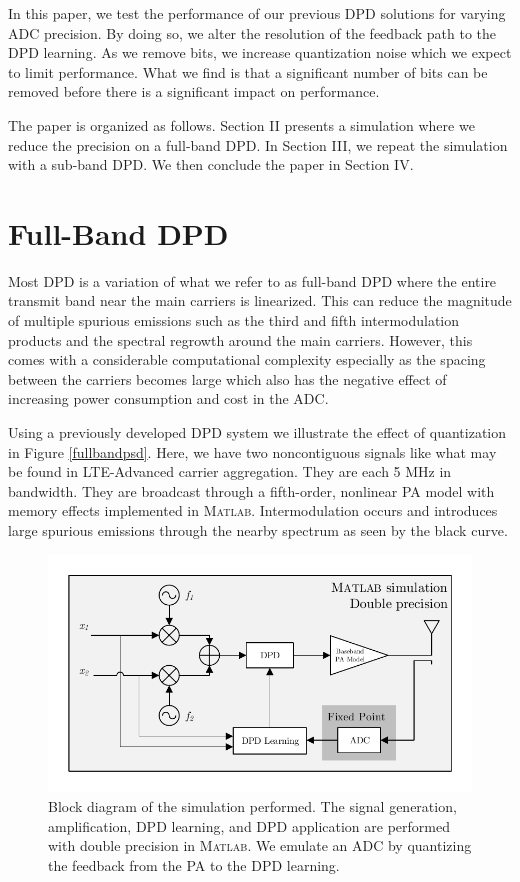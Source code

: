 \documentclass[conference]{IEEEtran}
\begin{document}
In this paper, we test the performance of our previous DPD solutions for varying ADC precision. 
By doing so, we alter the resolution of the feedback path to the DPD learning. 
As we remove bits, we increase quantization noise which we expect to limit performance. 
What we find is that a significant number of bits can be removed before there is a significant impact on performance.

The paper is organized as follows. 
Section II presents a simulation where we reduce the precision on a full-band DPD. 
In Section III, we repeat the simulation with a sub-band DPD. 
We then conclude the paper in Section IV.

\section{Full-Band DPD}
Most DPD is a variation of what we refer to as full-band DPD where the entire transmit band near the main carriers is linearized. 
This can reduce the magnitude of multiple spurious emissions such as the third and fifth intermodulation products and the spectral regrowth around the main carriers. 
However, this comes with a considerable computational complexity especially as the spacing between the carriers becomes large \cite{TMTT_SubbandDPD} which also has the negative effect of increasing power consumption and cost in the ADC.

Using a previously developed DPD system \cite{Li2016GPU} we illustrate the effect of quantization in Figure \ref{fullbandpsd}. 
Here, we have two noncontiguous signals like what may be found in LTE-Advanced carrier aggregation. They are each 5 MHz in bandwidth. 
They are broadcast through a fifth-order, nonlinear PA model with memory effects implemented in \textsc{Matlab}. 
Intermodulation occurs and introduces large spurious emissions through the nearby spectrum as seen by the black curve.


\begin{figure}[]
	\centering
	\includegraphics[width=\columnwidth]{BlockDiagram2}
	\caption{Block diagram of the simulation performed. The signal generation, amplification, DPD learning, and DPD application are performed with double precision in \textsc{Matlab}. We emulate an ADC by quantizing the feedback from the PA to the DPD learning.}
	\label{block}
\end{figure}
\end{document}
